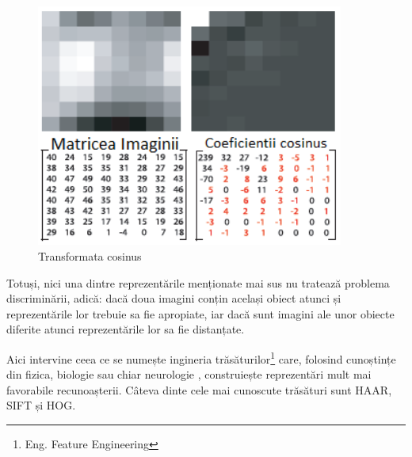 \begin{figure}[H]
	\centering
		\includegraphics[width=0.90\textwidth]{imagini/take_DCT.png}
	\caption{Transformata cosinus\protect\footnotemark}
	\label{fig:take_DCT}
\end{figure}


Totuși, nici una dintre reprezentările menționate mai sus nu tratează problema discriminării, adică: dacă doua imagini conțin același obiect atunci și reprezentările lor trebuie sa fie apropiate, iar dacă sunt imagini ale unor obiecte diferite atunci reprezentările lor sa fie distanțate.

Aici intervine ceea ce se numește ingineria trăsăturilor\footnote{Eng. Feature Engineering} care, folosind cunoștințe din fizica, biologie sau chiar neurologie , construiește reprezentări mult mai favorabile recunoașterii.
Câteva dinte cele mai cunoscute trăsături sunt HAAR\cite{Viola01robustreal-time}, SIFT\cite{Lowe99objectrecognition} și HOG\cite{Dalal05histogramsof}.

